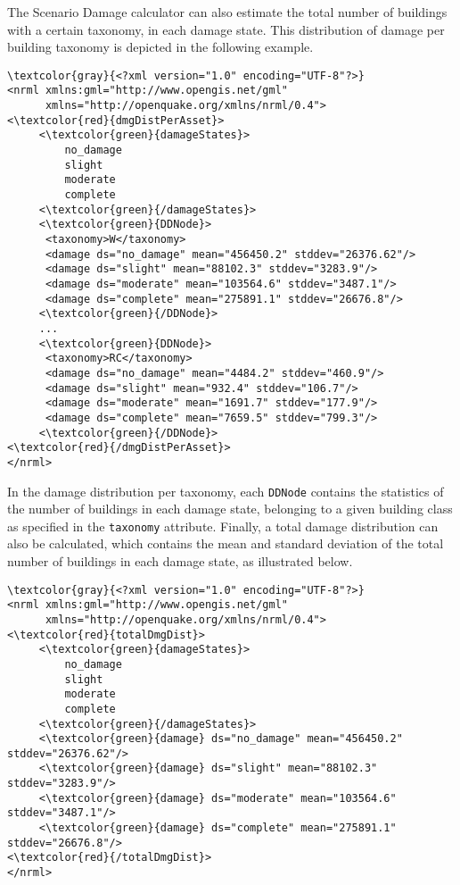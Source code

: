 The Scenario Damage calculator can also estimate the total number of buildings with a certain \gls{taxonomy}, in each damage state. This  distribution of damage per building \gls{taxonomy} is depicted in the following example.

\begin{Verbatim}[frame=single, commandchars=\\\{\}, samepage=false]
\textcolor{gray}{<?xml version="1.0" encoding="UTF-8"?>}
<nrml xmlns:gml="http://www.opengis.net/gml"
      xmlns="http://openquake.org/xmlns/nrml/0.4">
<\textcolor{red}{dmgDistPerAsset}>
     <\textcolor{green}{damageStates}>
         no_damage
         slight
         moderate
         complete
     <\textcolor{green}{/damageStates}>
     <\textcolor{green}{DDNode}>
      <taxonomy>W</taxonomy>
      <damage ds="no_damage" mean="456450.2" stddev="26376.62"/>
      <damage ds="slight" mean="88102.3" stddev="3283.9"/>
      <damage ds="moderate" mean="103564.6" stddev="3487.1"/>
      <damage ds="complete" mean="275891.1" stddev="26676.8"/>
     <\textcolor{green}{/DDNode}>
     ...
     <\textcolor{green}{DDNode}>
      <taxonomy>RC</taxonomy>
      <damage ds="no_damage" mean="4484.2" stddev="460.9"/>
      <damage ds="slight" mean="932.4" stddev="106.7"/>
      <damage ds="moderate" mean="1691.7" stddev="177.9"/>
      <damage ds="complete" mean="7659.5" stddev="799.3"/>
     <\textcolor{green}{/DDNode}>
<\textcolor{red}{/dmgDistPerAsset}>
</nrml>
\end{Verbatim}

In the damage distribution per \gls{taxonomy}, each \Verb+DDNode+ contains the statistics of the number of buildings in each damage state, belonging to a given building class as specified in the \Verb+taxonomy+ attribute.
Finally, a total damage distribution can also be calculated, which contains the mean and standard deviation of the total number of buildings in each damage state, as illustrated below.

\begin{Verbatim}[frame=single, commandchars=\\\{\}, samepage=false]
\textcolor{gray}{<?xml version="1.0" encoding="UTF-8"?>}
<nrml xmlns:gml="http://www.opengis.net/gml"
      xmlns="http://openquake.org/xmlns/nrml/0.4">
<\textcolor{red}{totalDmgDist}>
     <\textcolor{green}{damageStates}>
         no_damage
         slight
         moderate
         complete
     <\textcolor{green}{/damageStates}>
     <\textcolor{green}{damage} ds="no_damage" mean="456450.2" stddev="26376.62"/>
     <\textcolor{green}{damage} ds="slight" mean="88102.3" stddev="3283.9"/>
     <\textcolor{green}{damage} ds="moderate" mean="103564.6" stddev="3487.1"/>
     <\textcolor{green}{damage} ds="complete" mean="275891.1" stddev="26676.8"/>
<\textcolor{red}{/totalDmgDist}>
</nrml>
\end{Verbatim}

